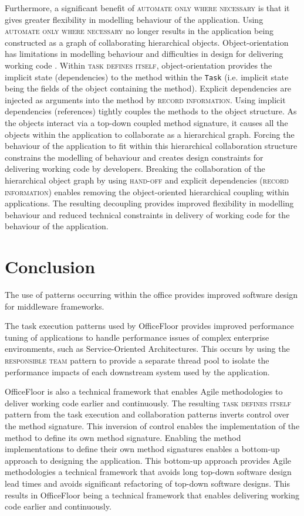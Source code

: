 \documentclass[prodmode]{style/acmlarge}
\begin{document}
Furthermore, a significant benefit of \textsc{automate only where necessary} is
that it gives greater flexibility in modelling behaviour of the application.
Using \textsc{automate only where necessary} no longer results in the
application being constructed as a graph of collaborating hierarchical objects.
Object-orientation has limitations in modelling behaviour
\cite{oo-behaviour,bridging-function-oo} and difficulties in design for
delivering working code \cite{oo-design}.  Within \textsc{task defines itself},
object-orientation provides the implicit state (dependencies) to the method
within the \texttt{Task} (i.e. implicit state being the fields of the object
containing the method).  Explicit dependencies are injected as arguments into
the method by \textsc{record information}.  Using implicit dependencies
(references) tightly couples the methods to the object structure.  As the
objects interact via a top-down coupled method signature, it causes all the
objects within the application to collaborate as a hierarchical graph.  Forcing
the behaviour of the application to fit within this hierarchical collaboration
structure constrains the modelling of behaviour and creates design constraints
for delivering working code by developers.  Breaking the collaboration of the
hierarchical object graph by using \textsc{hand-off} and explicit dependencies
(\textsc{record information}) enables removing the object-oriented hierarchical
coupling within applications.  The resulting decoupling provides improved
flexibility in modelling behaviour and reduced technical constraints in delivery
of working code for the behaviour of the application.



\section{Conclusion}

The use of patterns occurring within the office provides improved software
design for middleware frameworks.

The task execution patterns used by OfficeFloor provides improved performance
tuning of applications to handle performance issues of complex enterprise
environments, such as Service-Oriented Architectures.  This occurs by using the
\textsc{responsible team} pattern to provide a separate thread pool to isolate
the performance impacts of each downstream system used by the application.

OfficeFloor is also a technical framework that enables Agile methodologies to
deliver working code earlier and continuously.  The resulting \textsc{task
defines itself} pattern from the task execution and collaboration patterns
inverts control over the method signature.  This inversion of control enables
the implementation of the method to define its own method signature.  Enabling
the method implementations to define their own method signatures enables a
bottom-up approach to designing the application.  This bottom-up approach
provides Agile methodologies a technical framework that avoids long top-down
software design lead times and avoids significant refactoring of top-down
software designs.  This results in OfficeFloor being a technical framework that
enables delivering working code earlier and continuously.
\end{document}
